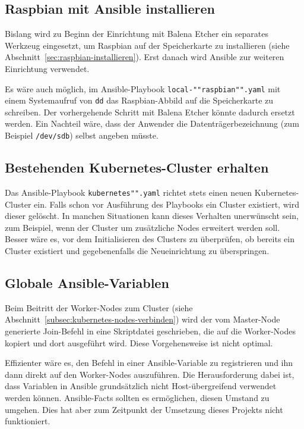 \subsection{Raspbian mit Ansible installieren}

Bislang wird zu Beginn der Einrichtung mit Balena Etcher ein separates Werkzeug eingesetzt, um Raspbian auf der Speicherkarte zu installieren (siehe Abschnitt~\ref{sec:raspbian-installieren}).
Erst danach wird Ansible zur weiteren Einrichtung verwendet.

Es wäre auch möglich, im Ansible-Playbook \texttt{local-""raspbian"".yaml} mit einem Systemaufruf von \texttt{dd} das Raspbian-Abbild auf die Speicherkarte zu schreiben.
Der vorhergehende Schritt mit Balena Etcher könnte dadurch ersetzt werden.
Ein Nachteil wäre, dass der Anwender die Datenträgerbezeichnung (zum Beispiel \texttt{/dev/sdb}) selbst angeben müsste.

\subsection{Bestehenden Kubernetes-Cluster erhalten}

Das Ansible-Playbook \texttt{kubernetes"".yaml} richtet stets einen neuen Kubernetes-Cluster ein.
Falls schon vor Ausführung des Playbooks ein Cluster existiert, wird dieser gelöscht.
In manchen Situationen kann dieses Verhalten unerwünscht sein, zum Beispiel, wenn der Cluster um zusätzliche Nodes erweitert werden soll.
Besser wäre es, vor dem Initialisieren des Clusters zu überprüfen, ob bereits ein Cluster existiert und gegebenenfalls die Neueinrichtung zu überspringen.

\subsection{Globale Ansible-Variablen}

Beim Beitritt der Worker-Nodes zum Cluster (siehe Abschnitt~\ref{subsec:kubernetes-nodes-verbinden}) wird der vom Master-Node generierte Join-Befehl in eine Skriptdatei geschrieben, die auf die Worker-Nodes kopiert und dort ausgeführt wird.
Diese Vorgehensweise ist nicht optimal.

Effizienter wäre es, den Befehl in einer Ansible-Variable zu registrieren und ihn dann direkt auf den Worker-Nodes auszuführen.
Die Herausforderung dabei ist, dass Variablen in Ansible grundsätzlich nicht Host-übergreifend verwendet werden können.
Ansible-Facts sollten es ermöglichen, diesen Umstand zu umgehen.
Dies hat aber zum Zeitpunkt der Umsetzung dieses Projekts nicht funktioniert.
